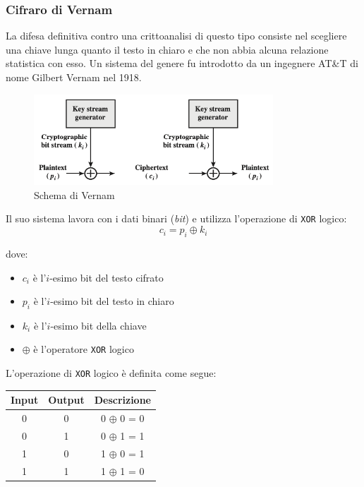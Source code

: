 \subsubsection{Cifraro di Vernam}
La difesa definitiva contro una crittoanalisi di questo tipo consiste nel scegliere una chiave
lunga quanto il testo in chiaro e che non abbia alcuna relazione statistica con esso. Un sistema
del genere fu introdotto da un ingegnere AT\&T di nome Gilbert Vernam nel 1918.

\begin{figure}[H]
    \centering
    \includegraphics[width=0.8\textwidth]{img/xor_logico.png}
    \caption{Schema di Vernam}
    \label{fig:vernam}
\end{figure}
Il suo sistema lavora con i dati binari (\textit{bit}) e utilizza l'operazione di \verb|XOR| logico:
\[
  c_i = p_i \oplus k_i  
\]

dove:
\begin{itemize}
    \item $c_i$ è l'$i$-esimo bit del testo cifrato
    \item $p_i$ è l'$i$-esimo bit del testo in chiaro
    \item $k_i$ è l'$i$-esimo bit della chiave
    \item $\oplus$ è l'operatore \verb|XOR| logico
\end{itemize}

L'operazione di \verb|XOR| logico è definita come segue:
\begin{table}[H]
    \centering
    \begin{tabular}{|c|c|c|}
    \hline
    \textbf{Input} & \textbf{Output} & \textbf{Descrizione} \\
    \hline
    0 & 0 & 0 $\oplus$ 0 = 0 \\
    \hline
    0 & 1 & 0 $\oplus$ 1 = 1 \\
    \hline
    1 & 0 & 1 $\oplus$ 0 = 1 \\
    \hline
    1 & 1 & 1 $\oplus$ 1 = 0 \\
    \hline
    \end{tabular}
\end{table}

